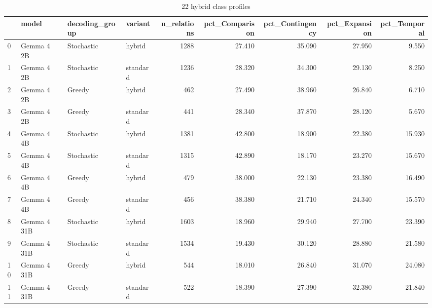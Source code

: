 \begin{table}
\caption{22 hybrid class profiles}
\begin{tabular}{llllrrrrr}
\toprule
 & model & decoding\_group & variant & n\_relations & pct\_Comparison & pct\_Contingency & pct\_Expansion & pct\_Temporal \\
\midrule
0 & Gemma 4 2B & Stochastic & hybrid & 1288 & 27.410 & 35.090 & 27.950 & 9.550 \\
1 & Gemma 4 2B & Stochastic & standard & 1236 & 28.320 & 34.300 & 29.130 & 8.250 \\
2 & Gemma 4 2B & Greedy & hybrid & 462 & 27.490 & 38.960 & 26.840 & 6.710 \\
3 & Gemma 4 2B & Greedy & standard & 441 & 28.340 & 37.870 & 28.120 & 5.670 \\
4 & Gemma 4 4B & Stochastic & hybrid & 1381 & 42.800 & 18.900 & 22.380 & 15.930 \\
5 & Gemma 4 4B & Stochastic & standard & 1315 & 42.890 & 18.170 & 23.270 & 15.670 \\
6 & Gemma 4 4B & Greedy & hybrid & 479 & 38.000 & 22.130 & 23.380 & 16.490 \\
7 & Gemma 4 4B & Greedy & standard & 456 & 38.380 & 21.710 & 24.340 & 15.570 \\
8 & Gemma 4 31B & Stochastic & hybrid & 1603 & 18.960 & 29.940 & 27.700 & 23.390 \\
9 & Gemma 4 31B & Stochastic & standard & 1534 & 19.430 & 30.120 & 28.880 & 21.580 \\
10 & Gemma 4 31B & Greedy & hybrid & 544 & 18.010 & 26.840 & 31.070 & 24.080 \\
11 & Gemma 4 31B & Greedy & standard & 522 & 18.390 & 27.390 & 32.380 & 21.840 \\
\bottomrule
\end{tabular}
\end{table}
